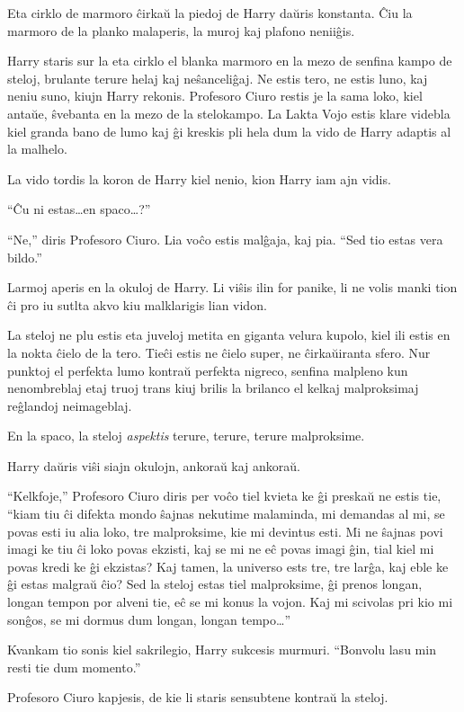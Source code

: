 Eta cirklo de marmoro ĉirkaŭ la piedoj de Harry daŭris konstanta. Ĉiu
la marmoro de la planko malaperis, la muroj kaj plafono neniiĝis.

Harry staris sur la eta cirklo el blanka marmoro en la mezo de senfina
kampo de steloj, brulante terure helaj kaj neŝanceliĝaj. Ne estis
tero, ne estis luno, kaj neniu suno, kiujn Harry rekonis. Profesoro
Ciuro restis je la sama loko, kiel antaŭe, ŝvebanta en la mezo de la
stelokampo. La Lakta Vojo estis klare videbla kiel granda bano de lumo
kaj ĝi kreskis pli hela dum la vido de Harry adaptis al la malhelo.

La vido tordis la koron de Harry kiel nenio, kion Harry iam ajn vidis.

``Ĉu ni estas\ldots en spaco\ldots?''

``Ne,'' diris Profesoro Ciuro. Lia voĉo estis malĝaja, kaj pia. ``Sed tio estas vera bildo.''

Larmoj aperis en la okuloj de Harry. Li viŝis ilin for panike, li ne
volis manki tion ĉi pro iu sutlta akvo kiu malklarigis lian vidon.

La steloj ne plu estis eta juveloj metita en giganta velura kupolo,
kiel ili estis en la nokta ĉielo de la tero. Tieĉi estis ne ĉielo
super, ne ĉirkaŭiranta sfero. Nur punktoj el perfekta lumo kontraŭ
perfekta nigreco, senfina malpleno kun nenombreblaj etaj truoj trans
kiuj brilis la brilanco el kelkaj malproksimaj reĝlandoj neimageblaj.

En la spaco, la steloj \emph{aspektis} terure, terure, terure malproksime.

Harry daŭris viŝi siajn okulojn, ankoraŭ kaj ankoraŭ.

``Kelkfoje,'' Profesoro Ciuro diris per voĉo tiel kvieta ke ĝi preskaŭ
ne estis tie, ``kiam tiu ĉi difekta mondo ŝajnas nekutime malaminda,
mi demandas al mi, se povas esti iu alia loko, tre malproksime, kie mi
devintus esti. Mi ne ŝajnas povi imagi ke tiu ĉi loko povas ekzisti,
kaj se mi ne eĉ povas imagi ĝin, tial kiel mi povas kredi ke ĝi
ekzistas? Kaj tamen, la universo ests tre, tre larĝa, kaj eble ke ĝi
estas malgraŭ ĉio?  Sed la steloj estas tiel malproksime, ĝi prenos
longan, longan tempon por alveni tie, eĉ se mi konus la vojon. Kaj mi
scivolas pri kio mi sonĝos, se mi dormus dum longan, longan
tempo\ldots''

Kvankam tio sonis kiel sakrilegio, Harry sukcesis murmuri. ``Bonvolu
lasu min resti tie dum momento.''

Profesoro Ciuro kapjesis, de kie li staris sensubtene kontraŭ la
steloj.

